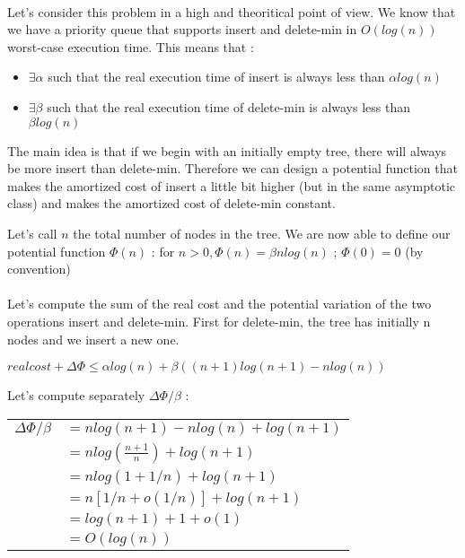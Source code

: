 \paragraph{}
Let's consider this problem in a high and theoritical point of view. We know that we have a priority queue that supports insert and delete-min in $O(log(n))$ worst-case execution time. This means that :
\begin{itemize}
	\item $\exists \alpha$ such that the real execution time of insert is always less than $\alpha log(n)$
	\item $\exists \beta$ such that the real execution time of delete-min is always less than $\beta log(n)$
\end{itemize}

The main idea is that if we begin with an initially empty tree, there will always be more insert than delete-min. Therefore we can design a potential function that makes the amortized cost of insert a little bit higher (but in the same asymptotic class) and makes the amortized cost of delete-min constant.

Let's call $n$ the total number of nodes in the tree. We are now able to define our potential function $\Phi(n)$ :
for $ n > 0, \Phi(n) = \beta n log(n)$ ; $\Phi(0) = 0 $ (by convention)

\paragraph{}

Let's compute the sum of the real cost and the potential variation of the two operations insert and delete-min.
First for delete-min, the tree has initially n nodes and we insert a new one.

$real cost + \Delta\Phi \leqslant \alpha log(n) + \beta((n+1)log(n+1)-nlog(n))$

Let's compute separately $ \Delta\Phi / \beta $ :

\begin{tabular}{rl}
$ \Delta\Phi / \beta$  & $= n log(n+1) -n log(n) + log(n+1)$ \\

& $= n log(\frac{n+1}{n}) + log(n+1)$ \\

& $= n log(1+ 1/n) + log(n+1)$ \\

& $= n[1/n + o(1/n)] + log(n+1)$ \\

& $= log(n+1) +1 + o(1) $ \\

& $= O(log(n))$ \\

\end{tabular}

